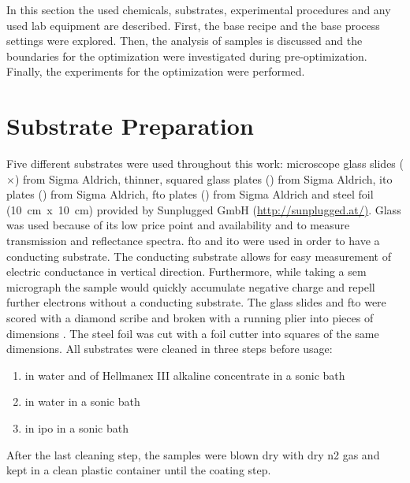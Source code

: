 In this section the used chemicals, substrates, experimental procedures and any used lab equipment are described. 
First, the base recipe and the base process settings were explored. 
Then, the analysis of samples is discussed and the boundaries for the optimization were investigated during pre-optimization.
Finally, the experiments for the optimization were performed.

\section{Substrate Preparation}
Five different substrates were used throughout this work: 
microscope glass slides 
\linebreak[4] 
($\times$) from Sigma Aldrich, thinner, 
squared glass plates (\x{}) from Sigma Aldrich, 
\gls{ito} plates (\x{}) from Sigma Aldrich, 
\gls{fto} plates (\x{}) from Sigma Aldrich and steel foil (10~cm~x~10~cm) provided by Sunplugged GmbH (\url{http://sunplugged.at/)}.
%
Glass was used because of its low price point and availability and to measure transmission and reflectance spectra. 
\gls{fto} and \gls{ito} were used in order to have a conducting substrate. 
The conducting substrate allows for easy measurement of electric conductance in vertical direction.
Furthermore, while taking a \gls{sem} micrograph the sample would quickly accumulate negative charge and repell further electrons without a conducting substrate.
The glass slides and \gls{fto} were scored with a diamond scribe and broken with a running plier into pieces of dimensions \x{}.
The steel foil was cut with a foil cutter into squares of the same dimensions. 
All substrates were cleaned in three steps before usage:
\begin{enumerate}
	\item {} in  \gls{water} and  of Hellmanex III alkaline concentrate in a sonic bath
	\item {} in \gls{water} in a sonic bath
	\item {} in \gls{ipo} in a sonic bath 
\end{enumerate}
After the last cleaning step, the samples were blown dry with dry \gls{n2} gas and kept in a clean plastic container until the coating step.

